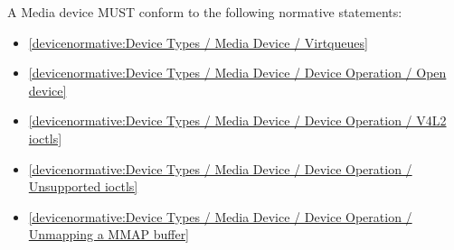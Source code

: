 \label{sec:Conformance / Device Conformance / Media Device Conformance}

A Media device MUST conform to the following normative statements:

\begin{itemize}
\item \ref{devicenormative:Device Types / Media Device / Virtqueues}
\item \ref{devicenormative:Device Types / Media Device / Device Operation / Open device}
\item \ref{devicenormative:Device Types / Media Device / Device Operation / V4L2 ioctls}
\item \ref{devicenormative:Device Types / Media Device / Device Operation / Unsupported ioctls}
\item \ref{devicenormative:Device Types / Media Device / Device Operation / Unmapping a MMAP buffer}
\end{itemize}